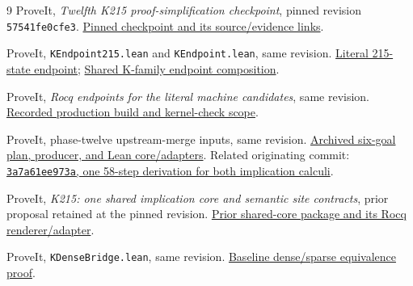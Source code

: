 \documentclass[11pt]{article}
\begin{document}
\begin{thebibliography}{9}
ProveIt, \emph{Twelfth K215 proof-simplification checkpoint}, pinned revision \texttt{57541fe0cfe3}.
\href{https://github.com/VladimirReshetnikov/ProveIt/blob/57541fe0cfe3af62b4cb58747d8d1d7c16b338d5/Computability/BusyBeaver/Research/ZFC/k225-formal/verification/k215/simplification/phase12/README.md}{Pinned checkpoint and its source/evidence links}.

ProveIt, \texttt{KEndpoint215.lean} and \texttt{KEndpoint.lean}, same revision.
\href{https://github.com/VladimirReshetnikov/ProveIt/blob/57541fe0cfe3af62b4cb58747d8d1d7c16b338d5/Computability/BusyBeaver/Lean/BusyBeaver/ZFC/KEndpoint215.lean}{Literal 215-state endpoint};
\href{https://github.com/VladimirReshetnikov/ProveIt/blob/57541fe0cfe3af62b4cb58747d8d1d7c16b338d5/Computability/BusyBeaver/Lean/BusyBeaver/ZFC/KEndpoint.lean}{Shared K-family endpoint composition}.

ProveIt, \emph{Rocq endpoints for the literal machine candidates}, same revision.
\href{https://github.com/VladimirReshetnikov/ProveIt/blob/57541fe0cfe3af62b4cb58747d8d1d7c16b338d5/Computability/BusyBeaver/Research/ZFC/k225-formal/rocq/README.md}{Recorded production build and kernel-check scope}.

ProveIt, phase-twelve upstream-merge inputs, same revision.
\href{https://github.com/VladimirReshetnikov/ProveIt/tree/57541fe0cfe3af62b4cb58747d8d1d7c16b338d5/Computability/BusyBeaver/Research/ZFC/k225-formal/verification/k215/simplification/phase12/upstream-merge/inputs}{Archived six-goal plan, producer, and Lean core/adapters}.
Related originating commit:
\href{https://github.com/VladimirReshetnikov/ProveIt/commit/3a7a61ee973a32777f2c5e07b8a304e6f4418b37}{\texttt{3a7a61ee973a}, one 58-step derivation for both implication calculi}.

ProveIt, \emph{K215: one shared implication core and semantic site contracts}, prior proposal retained at the pinned revision.
\href{https://github.com/VladimirReshetnikov/ProveIt/tree/57541fe0cfe3af62b4cb58747d8d1d7c16b338d5/Computability/BusyBeaver/Research/ZFC/k225-formal/verification/k215/simplification/proposals/shared-proof-core}{Prior shared-core package and its Rocq renderer/adapter}.

ProveIt, \texttt{KDenseBridge.lean}, same revision.
\href{https://github.com/VladimirReshetnikov/ProveIt/blob/57541fe0cfe3af62b4cb58747d8d1d7c16b338d5/Computability/BusyBeaver/Lean/BusyBeaver/ZFC/KDenseBridge.lean}{Baseline dense/sparse equivalence proof}.


\end{thebibliography}
\end{document}
